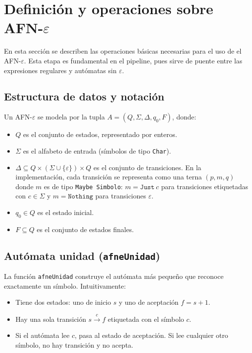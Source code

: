 
\section{Definición y operaciones sobre AFN-$\varepsilon$}

En esta sección se describen las operaciones básicas necesarias para el uso de el AFN-$\varepsilon$. Esta etapa es fundamental en el pipeline, pues sirve de puente entre las expresiones regulares y autómatas sin $\varepsilon$.

\subsection{Estructura de datos y notación}


Un AFN-$\varepsilon$ se modela por la tupla $A = (Q, \Sigma, \Delta, q_0, F)$, donde:

\begin{itemize}
    \item $Q$ es el conjunto de estados, representado por enteros.
    \item $\Sigma$ es el alfabeto de entrada (símbolos de tipo \texttt{Char}).
    \item $\Delta \subseteq Q \times (\Sigma \cup \{\varepsilon\}) \times Q$ es el conjunto de transiciones. En la implementación, cada transición se representa como una terna $(p, m, q)$ donde $m$ es de tipo \texttt{Maybe Simbolo}: $m = \texttt{Just}\ c$ para transiciones etiquetadas con $c \in \Sigma$ y $m = \texttt{Nothing}$ para transiciones $\varepsilon$.
    \item $q_0 \in Q$ es el estado inicial.
    \item $F \subseteq Q$ es el conjunto de estados finales.
\end{itemize}

\subsection{Autómata unidad (\texttt{afneUnidad})}

La función \texttt{afneUnidad} construye el autómata más pequeño que reconoce exactamente un símbolo. Intuitivamente:
\begin{itemize}
    \item Tiene dos estados: uno de inicio $s$ y uno de aceptación $f = s + 1$.
    \item Hay una sola transición $s \xrightarrow{c} f$ etiquetada con el símbolo $c$.
    \item Si el autómata lee $c$, pasa al estado de aceptación. Si lee cualquier otro símbolo, no hay transición y no acepta.
\end{itemize}

